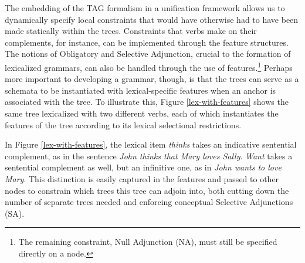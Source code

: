  
The embedding of the TAG formalism in a unification framework allows 
us to dynamically specify local constraints that would have otherwise 
had to have been made statically within the trees.  Constraints that 
verbs make on their complements, for instance, can be implemented 
through the feature structures.  The notions of Obligatory and 
Selective Adjunction, crucial to the formation of lexicalized 
grammars, can also be handled through the use of 
features.\footnote{The remaining constraint, Null Adjunction (NA), must still be specified directly on a node.} Perhaps more important to 
developing a grammar, though, is that the trees can serve as a 
schemata to be instantiated with lexical-specific features when an 
anchor is associated with the tree.  To illustrate this, Figure 
\ref{lex-with-features} shows the same tree lexicalized with two 
different verbs, each of which instantiates the features of the tree 
according to its lexical selectional restrictions. 
 
In Figure \ref{lex-with-features}, the lexical item {\it thinks} takes an 
indicative sentential complement, as in the sentence {\it John thinks that Mary loves Sally}.  {\it Want} takes a sentential complement as well, but an 
infinitive one, as in {\it John wants to love Mary}.  This distinction is 
easily captured in the features and passed to other nodes to constrain which 
trees this tree can adjoin into, both cutting down the number of separate trees 
needed and enforcing conceptual Selective Adjunctions (SA). 
 
 
